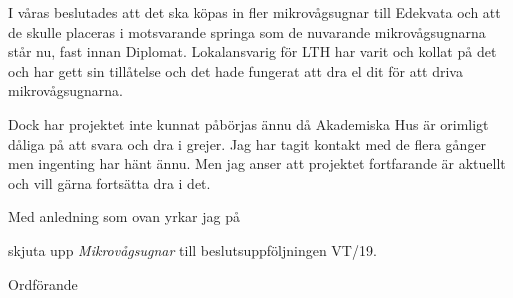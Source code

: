 \documentclass[../_main/handlingar.tex]{subfiles}
\begin{document}

I våras beslutades att det ska köpas in fler mikrovågsugnar till Edekvata och att de skulle placeras i motsvarande springa som de nuvarande mikrovågsugnarna står nu, fast innan Diplomat. Lokalansvarig för LTH har varit och kollat på det och har gett sin tillåtelse och det hade fungerat att dra el dit för att driva mikrovågsugnarna.

Dock har projektet inte kunnat påbörjas ännu då Akademiska Hus är orimligt dåliga på att svara och dra i grejer. Jag har tagit kontakt med de flera gånger men ingenting har hänt ännu. Men jag anser att projektet fortfarande är aktuellt och vill gärna fortsätta dra i det.

Med anledning som ovan yrkar jag på 
\begin{attsatser}
    \att skjuta upp \emph{Mikrovågsugnar} till beslutsuppföljningen VT/19.
\end{attsatser}

\begin{signatures}{1}
    \ist
    \signature{\ordf}{Ordförande}
\end{signatures}
\end{document}
